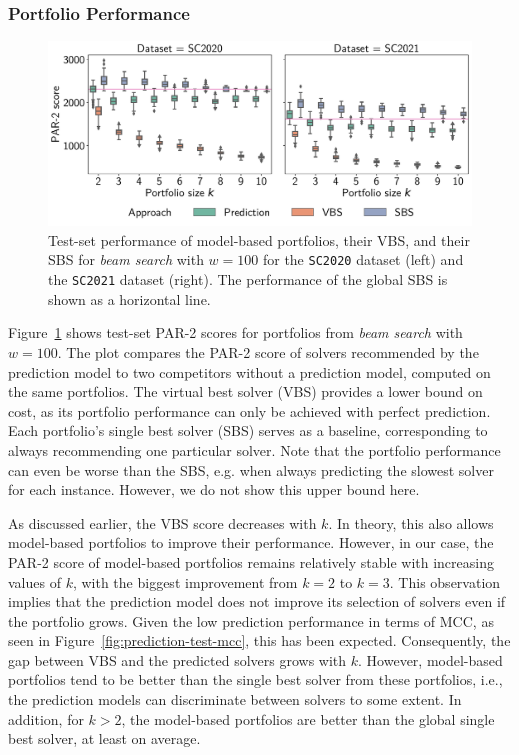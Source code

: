 \documentclass[a4paper,USenglish,pdfa]{lipics-v2021} %
\begin{document}
\subsubsection{Portfolio Performance}

\begin{figure}[tb]
	\centering
	\includegraphics[width=\columnwidth]{plots/prediction-test-objective-beam.pdf}
	\caption{
		Test-set performance of model-based portfolios, their VBS, and their SBS for \emph{beam search} with $w=100$ for the \texttt{SC2020} dataset (left) and the \texttt{SC2021} dataset (right).
		The performance of the global SBS is shown as a horizontal line.}
	\label{fig:prediction-test-objective-beam}
\end{figure}

Figure~\ref{fig:prediction-test-objective-beam} shows test-set PAR-2 scores for portfolios from \emph{beam search} with $w=100$.
The plot compares the PAR-2 score of solvers recommended by the prediction model to two competitors without a prediction model, computed on the same portfolios.
The virtual best solver (VBS) provides a lower bound on cost, as its portfolio performance can only be achieved with perfect prediction.
Each portfolio's single best solver (SBS) serves as a baseline, corresponding to always recommending one particular solver.
Note that the portfolio performance can even be worse than the SBS, e.g. when always predicting the slowest solver for each instance.
However, we do not show this upper bound here.

As discussed earlier, the VBS score decreases with $k$.
In theory, this also allows model-based portfolios to improve their performance.
However, in our case, the \mbox{PAR-2} score of model-based portfolios remains relatively stable with increasing values of $k$, with the biggest improvement from $k=2$ to $k=3$.
This observation implies that the prediction model does not improve its selection of solvers even if the portfolio grows.
Given the low prediction performance in terms of MCC, as seen in Figure~\ref{fig:prediction-test-mcc}, this has been expected.
Consequently, the gap between VBS and the predicted solvers grows with $k$.
However, model-based portfolios tend to be better than the single best solver from these portfolios, i.e., the prediction models can discriminate between solvers to some extent.
In addition, for $k > 2$, the model-based portfolios are better than the global single best solver, at least on average.
\end{document}
